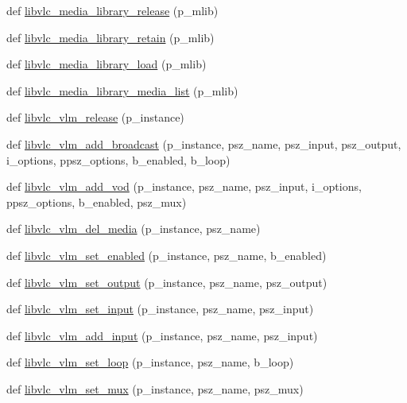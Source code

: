 \begin{DoxyCompactItemize}
\item 
def \hyperlink{namespacevlc_ab8ba23cb322d7e138eb8873e23796646}{libvlc\+\_\+media\+\_\+library\+\_\+release} (p\+\_\+mlib)
\item 
def \hyperlink{namespacevlc_a16294700c444448851d5055267aa57aa}{libvlc\+\_\+media\+\_\+library\+\_\+retain} (p\+\_\+mlib)
\item 
def \hyperlink{namespacevlc_aeaee7cdfd32d61475c51834969d42314}{libvlc\+\_\+media\+\_\+library\+\_\+load} (p\+\_\+mlib)
\item 
def \hyperlink{namespacevlc_a0df1f618236bf73ed4b0b4d17ca37a7c}{libvlc\+\_\+media\+\_\+library\+\_\+media\+\_\+list} (p\+\_\+mlib)
\item 
def \hyperlink{namespacevlc_a4aa32acd52d832cb9637629d14af97fb}{libvlc\+\_\+vlm\+\_\+release} (p\+\_\+instance)
\item 
def \hyperlink{namespacevlc_a7560226e5cabbe0664a8e51c772e07cf}{libvlc\+\_\+vlm\+\_\+add\+\_\+broadcast} (p\+\_\+instance, psz\+\_\+name, psz\+\_\+input, psz\+\_\+output, i\+\_\+options, ppsz\+\_\+options, b\+\_\+enabled, b\+\_\+loop)
\item 
def \hyperlink{namespacevlc_a2ce4add01e56693cb8ca2fdefa8233bb}{libvlc\+\_\+vlm\+\_\+add\+\_\+vod} (p\+\_\+instance, psz\+\_\+name, psz\+\_\+input, i\+\_\+options, ppsz\+\_\+options, b\+\_\+enabled, psz\+\_\+mux)
\item 
def \hyperlink{namespacevlc_a7142455eda42a304940d0c22450ede79}{libvlc\+\_\+vlm\+\_\+del\+\_\+media} (p\+\_\+instance, psz\+\_\+name)
\item 
def \hyperlink{namespacevlc_affb9bce216fa7e0b538a0d907e657c2c}{libvlc\+\_\+vlm\+\_\+set\+\_\+enabled} (p\+\_\+instance, psz\+\_\+name, b\+\_\+enabled)
\item 
def \hyperlink{namespacevlc_a2e543e6f50ea55fcf49d57eeb79dc5cc}{libvlc\+\_\+vlm\+\_\+set\+\_\+output} (p\+\_\+instance, psz\+\_\+name, psz\+\_\+output)
\item 
def \hyperlink{namespacevlc_a21fb77c5d5ad58c7f98cebf8ee173ad9}{libvlc\+\_\+vlm\+\_\+set\+\_\+input} (p\+\_\+instance, psz\+\_\+name, psz\+\_\+input)
\item 
def \hyperlink{namespacevlc_a59da7a569de70dd7f4b85f35706b0aa1}{libvlc\+\_\+vlm\+\_\+add\+\_\+input} (p\+\_\+instance, psz\+\_\+name, psz\+\_\+input)
\item 
def \hyperlink{namespacevlc_a7084066e89dbf3c908a9674d892875a1}{libvlc\+\_\+vlm\+\_\+set\+\_\+loop} (p\+\_\+instance, psz\+\_\+name, b\+\_\+loop)
\item 
def \hyperlink{namespacevlc_a34e533d7d8d01fefe3242f7de5773237}{libvlc\+\_\+vlm\+\_\+set\+\_\+mux} (p\+\_\+instance, psz\+\_\+name, psz\+\_\+mux)

\end{DoxyCompactItemize}
